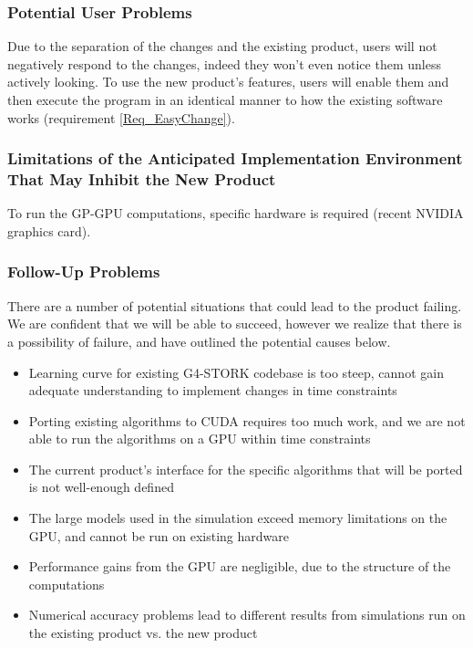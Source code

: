 \documentclass[12pt]{article}
\begin{document}
\subsubsection{Potential User Problems}
Due to the separation of the changes and the existing product, users will not negatively respond to the changes, indeed they won't even notice them unless actively looking. To use the new product's features, users will enable them and then execute the program in an identical manner to how the existing software works (requirement \ref{Req_EasyChange}).

\subsubsection{Limitations of the Anticipated Implementation Environment That May Inhibit the New Product}
To run the GP-GPU computations, specific hardware is required (recent NVIDIA graphics card).

\subsubsection{Follow-Up Problems}
There are a number of potential situations that could lead to the product failing. We are confident that we will be able to succeed, however we realize that there is a possibility of failure, and have outlined the potential causes below.
\begin{itemize}
\item Learning curve for existing G4-STORK codebase is too steep, cannot gain adequate understanding to implement changes in time constraints
\item Porting existing algorithms to CUDA requires too much work, and we are not able to run the algorithms on a GPU within time constraints
\item The current product's interface for the specific algorithms that will be ported is not well-enough defined
\item The large models used in the simulation exceed memory limitations on the GPU, and cannot be run on existing hardware
\item Performance gains from the GPU are negligible, due to the structure of the computations
\item Numerical accuracy problems lead to different results from simulations run on the existing product vs. the new product
\end{itemize}

\end{document}
